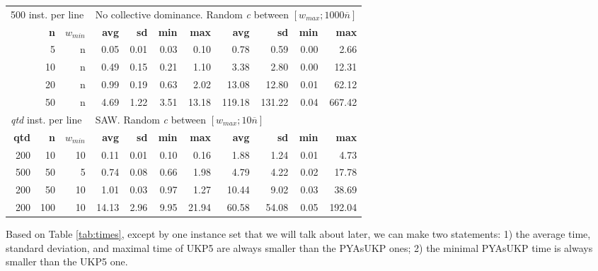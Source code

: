 \documentclass[runningheads,a4paper]{llncs}
\begin{document}
\begin{table}
\begin{tabular}{@{\extracolsep{4pt}}rrrrrrrrrrr@{}}
\multicolumn{3}{l}{500 inst. per line} & \multicolumn{8}{l}{No collective dominance. Random \emph{c} between \([w_{max}; 1000\overline{n}]\)}\\
\cline{1-3}\cline{4-11}
& \textbf{n} & \(w_{min}\) & \textbf{avg} & \textbf{sd} & \textbf{min} & \textbf{max} & \textbf{avg} & \textbf{sd} & \textbf{min} & \textbf{max}\\
\cline{1-3}\cline{4-7}\cline{8-11}
&  5 & n & 0.05 & 0.01 & 0.03 & 0.10 & 0.78 & 0.59 & 0.00 & 2.66\\
& 10 & n & 0.49 & 0.15 & 0.21 & 1.10 & 3.38 & 2.80 & 0.00 & 12.31\\
& 20 & n & 0.99 & 0.19 & 0.63 & 2.02 & 13.08 & 12.80 & 0.01 & 62.12\\
& 50 & n & 4.69 & 1.22 & 3.51 & 13.18 & 119.18 & 131.22 & 0.04 & 667.42\\
\hline

\multicolumn{3}{l}{\emph{qtd} inst. per line} & \multicolumn{8}{l}{SAW. Random \emph{c} between \([w_{max}; 10\overline{n}]\)}\\
\cline{1-3}\cline{4-11}
\textbf{qtd} & \textbf{n} & \(w_{min}\) & \textbf{avg} & \textbf{sd} & \textbf{min} & \textbf{max} & \textbf{avg} & \textbf{sd} & \textbf{min} & \textbf{max}\\
\cline{1-3}\cline{4-7}\cline{8-11}
~200 &  10 & 10 & 0.11 & 0.01 & 0.10 & 0.16 & 1.88 & 1.24 & 0.01 & 4.73\\
~500 &  50 &  5 & 0.74 & 0.08 & 0.66 & 1.98 & 4.79 & 4.22 & 0.02 & 17.78\\
~200 &  50 & 10 & 1.01 & 0.03 & 0.97 & 1.27 & 10.44 & 9.02 & 0.03 & 38.69\\
~200 & 100 & 10 & 14.13 & 2.96 & 9.95 & 21.94 & 60.58 & 54.08 & 0.05 & 192.04\\
\hline

\end{tabular}
\end{table}
Based on Table \ref{tab:times}, except by one instance set that we will talk about later, we can make two statements: 1) the average time, standard deviation, and maximal time of UKP5 are always smaller than the PYAsUKP ones; 2) the minimal PYAsUKP time is always smaller than the UKP5 one.
\end{document}
